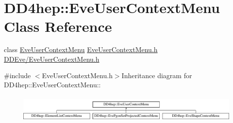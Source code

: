 \hypertarget{class_d_d4hep_1_1_eve_user_context_menu}{
\section{DD4hep::EveUserContextMenu Class Reference}
\label{class_d_d4hep_1_1_eve_user_context_menu}
}


class \hyperlink{class_d_d4hep_1_1_eve_user_context_menu}{EveUserContextMenu} \hyperlink{_eve_user_context_menu_8h}{EveUserContextMenu.h} \hyperlink{_eve_user_context_menu_8h}{DDEve/EveUserContextMenu.h}  


{\ttfamily \#include $<$EveUserContextMenu.h$>$}Inheritance diagram for DD4hep::EveUserContextMenu::\begin{figure}[H]
\begin{center}
\leavevmode
\includegraphics[height=1.38786cm]{class_d_d4hep_1_1_eve_user_context_menu}
\end{center}
\end{figure}

